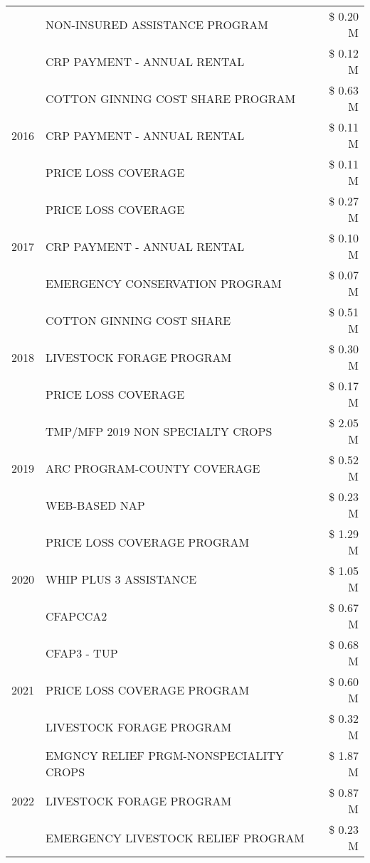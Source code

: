\begin{tabular}{llr}
 & NON-INSURED ASSISTANCE PROGRAM & \$ 0.20 M \\
 & CRP PAYMENT - ANNUAL RENTAL & \$ 0.12 M \\
\cline{1-3}
\multirow[t]{3}{*}{2016} & COTTON GINNING COST SHARE PROGRAM & \$ 0.63 M \\
 & CRP PAYMENT - ANNUAL RENTAL & \$ 0.11 M \\
 & PRICE LOSS COVERAGE & \$ 0.11 M \\
\cline{1-3}
\multirow[t]{3}{*}{2017} & PRICE LOSS COVERAGE & \$ 0.27 M \\
 & CRP PAYMENT - ANNUAL RENTAL & \$ 0.10 M \\
 & EMERGENCY CONSERVATION PROGRAM & \$ 0.07 M \\
\cline{1-3}
\multirow[t]{3}{*}{2018} & COTTON GINNING COST SHARE & \$ 0.51 M \\
 & LIVESTOCK FORAGE PROGRAM & \$ 0.30 M \\
 & PRICE LOSS COVERAGE & \$ 0.17 M \\
\cline{1-3}
\multirow[t]{3}{*}{2019} & TMP/MFP 2019 NON SPECIALTY CROPS & \$ 2.05 M \\
 & ARC PROGRAM-COUNTY COVERAGE & \$ 0.52 M \\
 & WEB-BASED NAP & \$ 0.23 M \\
\cline{1-3}
\multirow[t]{3}{*}{2020} & PRICE LOSS COVERAGE PROGRAM & \$ 1.29 M \\
 & WHIP PLUS 3 ASSISTANCE & \$ 1.05 M \\
 & CFAPCCA2 & \$ 0.67 M \\
\cline{1-3}
\multirow[t]{3}{*}{2021} & CFAP3 - TUP & \$ 0.68 M \\
 & PRICE LOSS COVERAGE PROGRAM & \$ 0.60 M \\
 & LIVESTOCK FORAGE PROGRAM & \$ 0.32 M \\
\cline{1-3}
\multirow[t]{3}{*}{2022} & EMGNCY RELIEF PRGM-NONSPECIALITY CROPS & \$ 1.87 M \\
 & LIVESTOCK FORAGE PROGRAM & \$ 0.87 M \\
 & EMERGENCY LIVESTOCK RELIEF PROGRAM & \$ 0.23 M \\
\cline{1-3}
\bottomrule
\end{tabular}
